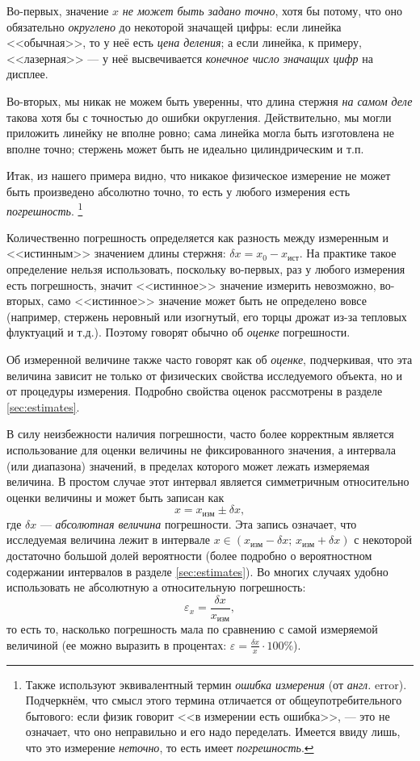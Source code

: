 Во-первых, значение $x$ \emph{не может быть задано точно}, хотя бы
потому, что оно обязательно \emph{округлено} до некоторой значащей
цифры: если линейка <<обычная>>, то у неё
есть \emph{цена деления}; а если линейка, к примеру, <<лазерная>>
--- у неё высвечивается \emph{конечное число значащих цифр}
на дисплее.

Во-вторых, мы никак не можем быть уверенны, что длина стержня \emph{на
самом деле} такова хотя бы с точностью до ошибки округления. Действительно,
мы могли приложить линейку не вполне ровно; сама линейка могла быть
изготовлена не вполне точно; стержень может быть не идеально цилиндрическим
и т.п.

Итак, из нашего примера видно, что никакое физическое измерение не может быть
произведено абсолютно точно, то есть у любого измерения есть \emph{погрешность}.
\footnote{Также используют эквивалентный термин \emph{ошибка измерения} (от\emph{
англ.} error). Подчеркнём, что смысл этого термина отличается от общеупотребительного
бытового: если физик говорит <<в измерении есть ошибка>>,
--- это не означает, что оно неправильно и его надо переделать.\emph{
}Имеется ввиду лишь, что это измерение \emph{неточно}, то есть имеет
\emph{погрешность}. } 

Количественно погрешность определяется как разность между измеренным и <<истинным>> значением длины стержня: $\delta x=x_{0}-x_{\text{ист}}$. На практике такое определение нельзя использовать, поскольку во-первых, раз у любого измерения есть погрешность, значит <<истинное>> значение измерить невозможно, во-вторых, само <<истинное>> значение может быть не определено вовсе (например, стержень неровный или изогнутый, его торцы дрожат из-за тепловых флуктуаций и т.д.). Поэтому говорят обычно об \emph{оценке} погрешности.

Об измеренной величине также часто говорят как об \emph{оценке}, подчеркивая, что эта величина зависит не только от физических свойства исследуемого объекта, но и от процедуры измерения. Подробно свойства оценок рассмотрены в разделе \ref{sec:estimates}.

В силу неизбежности наличия погрешности, часто более корректным является использование для оценки величины не фиксированного значения, а интервала (или диапазона) значений, в пределах которого может лежать измеряемая величина. В простом случае этот интервал является симметричным относительно оценки величины и может быть записан как
\[
x=x_{\text{изм}}\pm\delta x,
\]
где $\delta x$ --- \emph{абсолютная величина} погрешности.
Эта запись означает, что исследуемая величина лежит в интервале $x\in(x_{\text{изм}}-\delta x;\,x_{\text{изм}}+\delta x)$
с некоторой достаточно большой долей вероятности (более подробно о вероятностном содержании интервалов в разделе \ref{sec:estimates}). Во многих случаях удобно использовать не абсолютную а относительную погрешность:
\[
\varepsilon_{x}=\frac{\delta x}{x_{\text{изм}}},
\]
то есть то, насколько погрешность мала по сравнению с самой измеряемой
величиной (ее можно выразить в процентах: $\varepsilon=\frac{\delta x}{x}\cdot100\%$).

